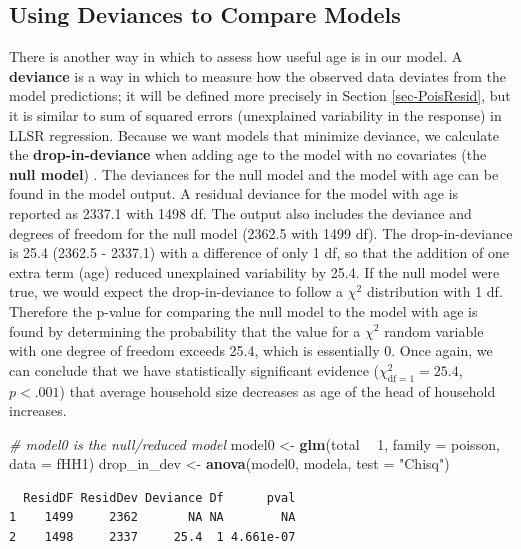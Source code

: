 \documentclass[
]{krantz}
\newenvironment{Shaded}{\begin{snugshade}}{\end{snugshade}}
\newcommand{\CommentTok}[1]{\textcolor[rgb]{0.37,0.37,0.37}{\textit{#1}}}
\newcommand{\DataTypeTok}[1]{\textcolor[rgb]{0.27,0.27,0.27}{#1}}
\newcommand{\DecValTok}[1]{\textcolor[rgb]{0.06,0.06,0.06}{#1}}
\newcommand{\KeywordTok}[1]{\textcolor[rgb]{0.27,0.27,0.27}{\textbf{#1}}}
\newcommand{\NormalTok}[1]{#1}
\newcommand{\OperatorTok}[1]{\textcolor[rgb]{0.43,0.43,0.43}{\textbf{#1}}}
\newcommand{\StringTok}[1]{\textcolor[rgb]{0.5,0.5,0.5}{#1}}
\begin{document}
\hypertarget{sec-Devtocompare}{%
\subsection{Using Deviances to Compare Models}\label{sec-Devtocompare}}

There is another way in which to assess how useful age is in our model. A \textbf{deviance}  is a way in which to measure how the observed data deviates from the model predictions; it will be defined more precisely in Section \ref{sec-PoisResid}, but it is similar to sum of squared errors (unexplained variability in the response) in LLSR regression. Because we want models that minimize deviance, we calculate the \textbf{drop-in-deviance}  when adding age to the model with no covariates (the \textbf{null model}) . The deviances for the null model and the model with age can be found in the model output. A residual deviance for the model with age is reported as 2337.1 with 1498 df. The output also includes the deviance and degrees of freedom for the null model (2362.5 with 1499 df). The drop-in-deviance is 25.4 (2362.5 - 2337.1) with a difference of only 1 df, so that the addition of one extra term (age) reduced unexplained variability by 25.4. If the null model were true, we would expect the drop-in-deviance to follow a \(\chi^2\) distribution with 1 df. Therefore the p-value for comparing the null model to the model with age is found by determining the probability that the value for a \(\chi^2\) random variable with one degree of freedom exceeds 25.4, which is essentially 0. Once again, we can conclude that we have statistically significant evidence (\(\chi^2_{\text{df} =1}=25.4\), \(p < .001\)) that average household size decreases as age of the head of household increases.

\begin{Shaded}
\begin{Highlighting}[]
\CommentTok{# model0 is the null/reduced model}
\NormalTok{model0 <-}\StringTok{ }\KeywordTok{glm}\NormalTok{(total }\OperatorTok{~}\StringTok{ }\DecValTok{1}\NormalTok{, }\DataTypeTok{family =}\NormalTok{ poisson, }\DataTypeTok{data =}\NormalTok{ fHH1)}
\NormalTok{drop_in_dev <-}\StringTok{ }\KeywordTok{anova}\NormalTok{(model0, modela, }\DataTypeTok{test =} \StringTok{"Chisq"}\NormalTok{)}
\end{Highlighting}
\end{Shaded}

\begin{verbatim}
  ResidDF ResidDev Deviance Df      pval
1    1499     2362       NA NA        NA
2    1498     2337     25.4  1 4.661e-07
\end{verbatim}
\end{document}
